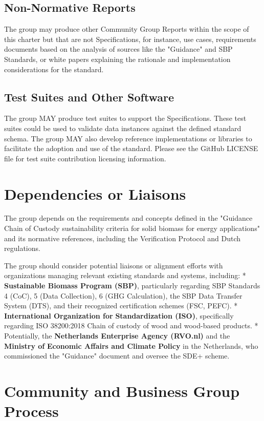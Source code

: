 \documentclass[title=small,preset=opensansnote,par=skip]{article}
\begin{document}
\subsection{Non-Normative Reports}
\label{sec:org6d6f870}

The group may produce other Community Group Reports within the scope of this charter but that are not Specifications, for instance, use cases, requirements documents based on the analysis of sources like the "Guidance" and SBP Standards, or white papers explaining the rationale and implementation considerations for the standard.
\subsection{Test Suites and Other Software}
\label{sec:orgcd83e3d}

The group MAY produce test suites to support the Specifications. These test suites could be used to validate data instances against the defined standard schema. The group MAY also develop reference implementations or libraries to facilitate the adoption and use of the standard. Please see the GitHub LICENSE file for test suite contribution licensing information.
\section{Dependencies or Liaisons}
\label{sec:org15ce070}

The group depends on the requirements and concepts defined in the "Guidance Chain of Custody sustainability criteria for solid biomass for energy applications" and its normative references, including the Verification Protocol and Dutch regulations.

The group should consider potential liaisons or alignment efforts with organizations managing relevant existing standards and systems, including: * \textbf{Sustainable Biomass Program (SBP)}, particularly regarding SBP Standards 4 (CoC), 5 (Data Collection), 6 (GHG Calculation), the SBP Data Transfer System (DTS), and their recognized certification schemes (FSC, PEFC). * \textbf{International Organization for} \textbf{Standardization (ISO)}, specifically regarding ISO 38200:2018 Chain of custody of wood and wood-based products. * Potentially, the \textbf{Netherlands Enterprise Agency (RVO.nl)} and the \textbf{Ministry of} \textbf{Economic Affairs and Climate Policy} in the Netherlands, who commissioned the "Guidance" document and oversee the SDE+ scheme.
\section{Community and Business Group Process}
\label{sec:org5277300}
\end{document}
